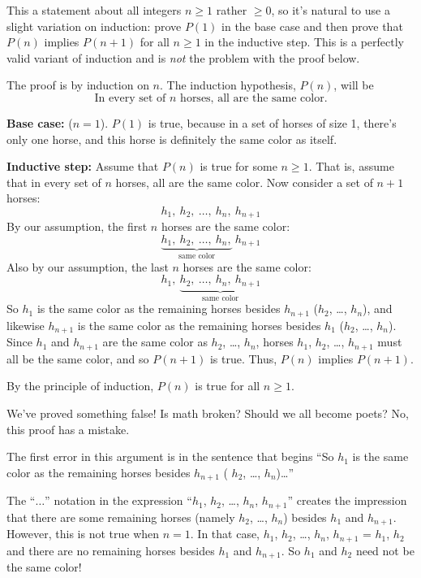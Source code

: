This a statement about all integers $n \geq 1$ rather $\geq 0$, so it's
natural to use a slight variation on induction: prove $P(1)$ in the base
case and then prove that $P(n)$ implies $P(n+1)$ for all $n \geq 1$ in the
inductive step.  This is a perfectly valid variant of induction and is
{\em not} the problem with the proof below.

\begin{falseproof}

The proof is by induction on $n$.  The induction hypothesis, $P(n)$, will be
\begin{equation}\label{horsehyp}
\text{In every set of $n$ horses, all are the same color.}
\end{equation}

\textbf{Base case:} ($n=1$).  $P(1)$ is true, because in a set of horses
of size 1, there's only one horse, and this horse is definitely the same
color as itself.

\textbf{Inductive step:} Assume that $P(n)$ is true for some $n \geq 1$.
That is, assume that in every set of $n$ horses, all are the same color.
Now consider a set of $n+1$ horses:
%
\[
h_1,\ h_2,\ \dots,\ h_n,\ h_{n+1}
\]
%
By our assumption, the first $n$ horses are the same color:
%
\[
\underbrace{h_1,\ h_2,\ \dots,\ h_n,}_{\text{same color}}\ h_{n+1}
\]
%
Also by our assumption, the last $n$ horses are the same color:
%
\[
h_1,\ \underbrace{h_2,\ \dots,\ h_n,\ h_{n+1}}_{\text{same color}}
\]
%
So $h_1$ is the same color as the remaining horses besides $h_{n+1}$
(\ie $h_2$, \ldots, $h_n$), and likewise $h_{n+1}$ is the same color
as the remaining horses besides $h_1$ (\ie $h_2$, \ldots, $h_n$).
Since $h_1$ and $h_{n+1}$ are the same color as $h_2$, \ldots, $h_n$,
horses $h_1$, $h_2$, \dots, $h_{n+1}$ must all be the same color, and so
$P(n+1)$ is true.  Thus, $P(n)$ implies $P(n+1)$.

By the principle of induction, $P(n)$ is true for all $n \geq 1$.
\end{falseproof}
We've proved something false!  Is math broken?  Should we all become
poets?  No, this proof has a mistake.

The first error in this argument is in the sentence that begins ``So
$h_1$ is the same color as the remaining horses besides $h_{n+1}$ (\ie
$h_2$, \ldots, $h_n$)\ldots''

The ``$\dots$'' notation in the expression ``$h_1$, $h_2$, \dots,
$h_n$, $h_{n+1}$'' creates the impression that there are some
remaining horses (namely $h_2$, \dots, $h_n$) besides $h_1$ and
$h_{n+1}$.  However, this is not true when $n = 1$.  In that case,
$h_1$, $h_2$, \dots, $h_n$, $h_{n+1}$ = $h_1$, $h_2$ and there are no
remaining horses besides $h_1$ and $h_{n+1}$.  So $h_1$ and $h_2$ need
not be the same color!


